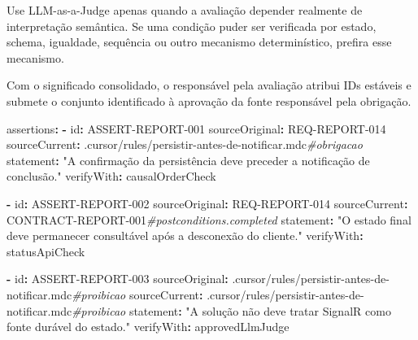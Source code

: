 \documentclass[
  10pt,
  a4paper,
  oneside]{book}
\newenvironment{Shaded}{}{}
\newcommand{\AttributeTok}[1]{\textcolor[rgb]{0.49,0.56,0.16}{#1}}
\newcommand{\CommentTok}[1]{\textcolor[rgb]{0.38,0.63,0.69}{\textit{#1}}}
\newcommand{\FunctionTok}[1]{\textcolor[rgb]{0.02,0.16,0.49}{#1}}
\newcommand{\KeywordTok}[1]{\textcolor[rgb]{0.00,0.44,0.13}{\textbf{#1}}}
\newcommand{\StringTok}[1]{\textcolor[rgb]{0.25,0.44,0.63}{#1}}
\renewenvironment{Shaded}{\begin{snugshade}}{\end{snugshade}}%
\begin{document}
Use LLM-as-a-Judge apenas quando a avaliação depender realmente de
interpretação semântica. Se uma condição puder ser verificada por
estado, schema, igualdade, sequência ou outro mecanismo determinístico,
prefira esse mecanismo.

Com o significado consolidado, o responsável pela avaliação atribui IDs
estáveis e submete o conjunto identificado à aprovação da fonte
responsável pela obrigação.

\begin{Shaded}
\begin{Highlighting}[]
\FunctionTok{assertions}\KeywordTok{:}
\AttributeTok{  }\KeywordTok{{-}}\AttributeTok{ }\FunctionTok{id}\KeywordTok{:}\AttributeTok{ ASSERT{-}REPORT{-}001}
\AttributeTok{    }\FunctionTok{sourceOriginal}\KeywordTok{:}\AttributeTok{ REQ{-}REPORT{-}014}
\AttributeTok{    }\FunctionTok{sourceCurrent}\KeywordTok{:}\AttributeTok{ .cursor/rules/persistir{-}antes{-}de{-}notificar.mdc}\CommentTok{\#obrigacao}
\AttributeTok{    }\FunctionTok{statement}\KeywordTok{:}\AttributeTok{ }\StringTok{"A confirmação da persistência deve preceder a notificação de conclusão."}
\AttributeTok{    }\FunctionTok{verifyWith}\KeywordTok{:}\AttributeTok{ causalOrderCheck}

\AttributeTok{  }\KeywordTok{{-}}\AttributeTok{ }\FunctionTok{id}\KeywordTok{:}\AttributeTok{ ASSERT{-}REPORT{-}002}
\AttributeTok{    }\FunctionTok{sourceOriginal}\KeywordTok{:}\AttributeTok{ REQ{-}REPORT{-}014}
\AttributeTok{    }\FunctionTok{sourceCurrent}\KeywordTok{:}\AttributeTok{ CONTRACT{-}REPORT{-}001}\CommentTok{\#postconditions.completed}
\AttributeTok{    }\FunctionTok{statement}\KeywordTok{:}\AttributeTok{ }\StringTok{"O estado final deve permanecer consultável após a desconexão do cliente."}
\AttributeTok{    }\FunctionTok{verifyWith}\KeywordTok{:}\AttributeTok{ statusApiCheck}

\AttributeTok{  }\KeywordTok{{-}}\AttributeTok{ }\FunctionTok{id}\KeywordTok{:}\AttributeTok{ ASSERT{-}REPORT{-}003}
\AttributeTok{    }\FunctionTok{sourceOriginal}\KeywordTok{:}\AttributeTok{ .cursor/rules/persistir{-}antes{-}de{-}notificar.mdc}\CommentTok{\#proibicao}
\AttributeTok{    }\FunctionTok{sourceCurrent}\KeywordTok{:}\AttributeTok{ .cursor/rules/persistir{-}antes{-}de{-}notificar.mdc}\CommentTok{\#proibicao}
\AttributeTok{    }\FunctionTok{statement}\KeywordTok{:}\AttributeTok{ }\StringTok{"A solução não deve tratar SignalR como fonte durável do estado."}
\AttributeTok{    }\FunctionTok{verifyWith}\KeywordTok{:}\AttributeTok{ approvedLlmJudge}
\end{Highlighting}
\end{Shaded}
\end{document}
